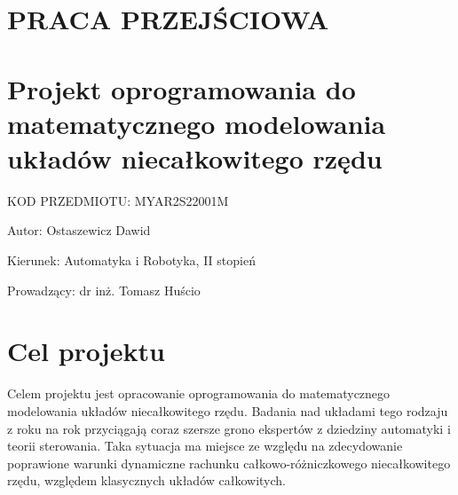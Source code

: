 \documentclass[polish,11pt,a4paper]{article}
\begin{document}
	
	\centering
	\section*{PRACA PRZEJŚCIOWA}
	\section*{Projekt oprogramowania do matematycznego modelowania układów niecałkowitego rzędu}
	
	\large
	KOD PRZEDMIOTU: MYAR2S22001M
	\break
	\large
	\break
	\break
	\break
	
	\raggedright
	Autor: Ostaszewicz Dawid
	\break
	
	Kierunek: Automatyka i Robotyka, II stopień

	Prowadzący: dr inż. Tomasz Huścio
	\clearpage
\justifying
\section*{Cel projektu}
Celem projektu jest opracowanie oprogramowania do matematycznego modelowania układów niecałkowitego rzędu. Badania nad układami tego rodzaju z roku na rok przyciągają coraz szersze grono ekspertów z dziedziny automatyki i teorii sterowania. Taka sytuacja ma miejsce ze względu na zdecydowanie poprawione warunki dynamiczne rachunku całkowo-różniczkowego niecałkowitego rzędu, względem klasycznych układów całkowitych.
\end{document}

